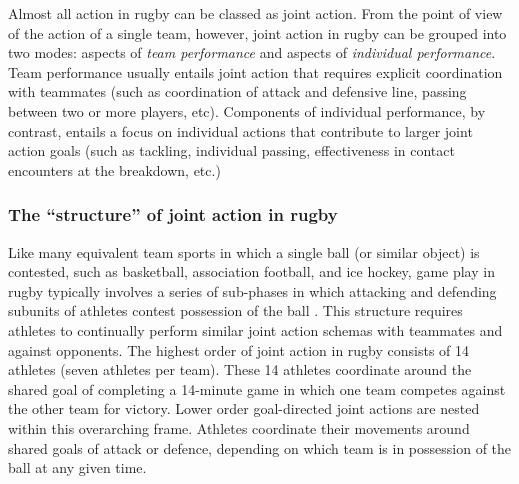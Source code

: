 \begin{CJK}{UTF8}{gbsn}



Almost all action in rugby can be classed as joint action.  From the point of view of the action of a single team, however, joint action in rugby can be grouped into two modes: aspects of \textit{team performance} and aspects of \textit{individual performance}.  Team performance usually entails joint action that requires explicit coordination with teammates (such as coordination of attack and defensive line, passing between two or more players, etc).  Components of individual performance, by contrast, entails a focus on individual actions that contribute to larger joint action goals (such as tackling, individual passing, effectiveness in contact encounters at the breakdown, etc.)




\subsubsection{The ``structure'' of joint action in rugby}
Like many equivalent team sports in which a single ball (or similar object) is contested, such as basketball, association football, and ice hockey, game play in rugby typically involves a series of sub-phases in which attacking and defending subunits of athletes contest possession of the ball \citep{Passos2011}.  This structure requires athletes to continually perform similar joint action schemas with teammates and against opponents.   The highest order of joint action in rugby consists of 14 athletes (seven athletes per team).  These 14 athletes coordinate around the shared goal of completing a 14-minute game in which one team competes against the other team for victory.  Lower order goal-directed joint actions are nested within this overarching frame.  Athletes coordinate their movements around shared goals of attack or defence, depending on which team is in possession of the ball at any given time.


\end{CJK}
